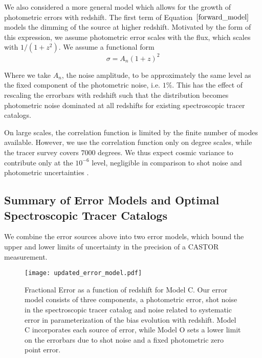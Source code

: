 \documentclass[fleqn,usenatbib]{mnras}
\begin{document}
We also considered a more general model which allows for the growth of photometric errors with redshift. The first term of Equation~$\ref{forward_model}$ models the dimming of the source at higher redshift. Motivated by the form of this expression, we assume photometric error scales with the flux, which scales with $1/(1+z^2)$. We assume a functional form
\begin{equation}
    \label{eqn: photo_z_growth} 
    \sigma = A_n(1+z)^2 
\end{equation}

Where we take $A_n$, the noise amplitude, to be approximately the same level as the fixed component of the photometric noise, i.e. $1\%$. This has the effect of rescaling the errorbars with redshift such that the distribution becomes photometric noise dominated at all redshifts for existing spectroscopic tracer catalogs. 

On large scales, the correlation function is limited by the finite number of modes available. However, we use the correlation function only on degree scales, while the tracer survey covers $7000$ degrees. We thus expect cosmic variance to contribute only at the $10^{-6}$  level, negligible in comparison to shot noise and photometric uncertainties \citep{Moster_2011}. 

\subsection{Summary of Error Models and Optimal Spectroscopic Tracer Catalogs}
\label{sec:error_summary}
We combine the error sources above into two error models, which bound the upper and lower limits of uncertainty in the precision of a {\small CASTOR} measurement.
\begin{figure}
\texttt{[image: updated\_error\_model.pdf]}
\caption{\label{fig:Error Models} Fractional Error as a function of redshift for Model C. Our error model consists of three components, a photometric error, shot noise in the spectroscopic tracer catalog and noise related to systematic error in parameterization of the bias evolution with redshift. Model C incorporates each source of error, while Model O sets a lower limit on the errorbars due to shot noise and a fixed photometric zero point error.}
\end{figure}
\end{document}
